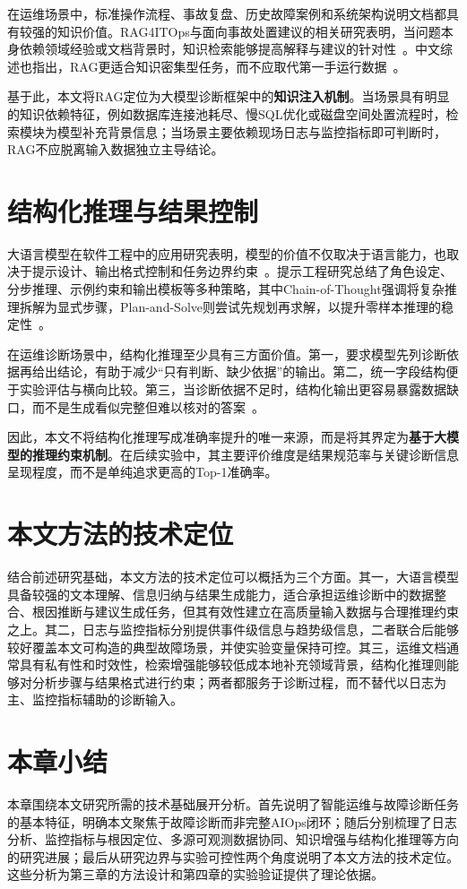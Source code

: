 在运维场景中，标准操作流程、事故复盘、历史故障案例和系统架构说明文档都具有较强的知识价值。RAG4ITOps与面向事故处置建议的相关研究表明，当问题本身依赖领域经验或文档背景时，知识检索能够提高解释与建议的针对性~\cite{zhang2024rag4itops,isaza2024ragincident}。中文综述也指出，RAG更适合知识密集型任务，而不应取代第一手运行数据~\cite{li2025ragsurveycn,zhang2026ragsecn}。

基于此，本文将RAG定位为大模型诊断框架中的\textbf{知识注入机制}。当场景具有明显的知识依赖特征，例如数据库连接池耗尽、慢SQL优化或磁盘空间处置流程时，检索模块为模型补充背景信息；当场景主要依赖现场日志与监控指标即可判断时，RAG不应脱离输入数据独立主导结论。

\section{结构化推理与结果控制}

大语言模型在软件工程中的应用研究表明，模型的价值不仅取决于语言能力，也取决于提示设计、输出格式控制和任务边界约束~\cite{hou2024llm4se}。提示工程研究总结了角色设定、分步推理、示例约束和输出模板等多种策略，其中Chain-of-Thought强调将复杂推理拆解为显式步骤，Plan-and-Solve则尝试先规划再求解，以提升零样本推理的稳定性~\cite{liu2023prompt,wei2022cot,wang2023planandsolve}。

在运维诊断场景中，结构化推理至少具有三方面价值。第一，要求模型先列诊断依据再给出结论，有助于减少“只有判断、缺少依据”的输出。第二，统一字段结构便于实验评估与横向比较。第三，当诊断依据不足时，结构化输出更容易暴露数据缺口，而不是生成看似完整但难以核对的答案~\cite{roy2024agents,szandala2025reliability,huang2025llmsafety}。

因此，本文不将结构化推理写成准确率提升的唯一来源，而是将其界定为\textbf{基于大模型的推理约束机制}。在后续实验中，其主要评价维度是结果规范率与关键诊断信息呈现程度，而不是单纯追求更高的Top-1准确率。

\section{本文方法的技术定位}

结合前述研究基础，本文方法的技术定位可以概括为三个方面。其一，大语言模型具备较强的文本理解、信息归纳与结果生成能力，适合承担运维诊断中的数据整合、根因推断与建议生成任务，但其有效性建立在高质量输入数据与合理推理约束之上。其二，日志与监控指标分别提供事件级信息与趋势级信息，二者联合后能够较好覆盖本文可构造的典型故障场景，并使实验变量保持可控。其三，运维文档通常具有私有性和时效性，检索增强能够较低成本地补充领域背景，结构化推理则能够对分析步骤与结果格式进行约束；两者都服务于诊断过程，而不替代以日志为主、监控指标辅助的诊断输入。

\section{本章小结}

本章围绕本文研究所需的技术基础展开分析。首先说明了智能运维与故障诊断任务的基本特征，明确本文聚焦于故障诊断而非完整AIOps闭环；随后分别梳理了日志分析、监控指标与根因定位、多源可观测数据协同、知识增强与结构化推理等方向的研究进展；最后从研究边界与实验可控性两个角度说明了本文方法的技术定位。这些分析为第三章的方法设计和第四章的实验验证提供了理论依据。
